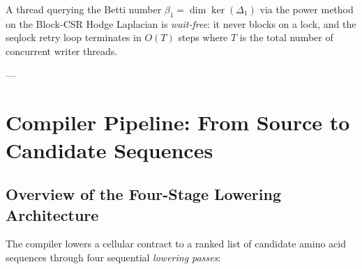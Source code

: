 \begin{corollary}
\label{cor:waitfree_homology}
A thread querying the Betti number $\beta_1 = \dim\ker(\Delta_1)$ via
the power method on the Block-CSR Hodge Laplacian is \emph{wait-free}:
it never blocks on a lock, and the seqlock retry loop terminates in
$O(T)$ steps where $T$ is the total number of concurrent writer threads.
\end{corollary}

---

\section{Compiler Pipeline: From \ToposLang{} Source to Candidate Sequences}
\label{sec:impl_compiler_pipeline}

\subsection{Overview of the Four-Stage Lowering Architecture}
\label{subsec:lowering_overview}

The \PLQ{} compiler lowers a \ToposLang{} cellular contract to a ranked
list of candidate amino acid sequences through four sequential
\emph{lowering passes}:

